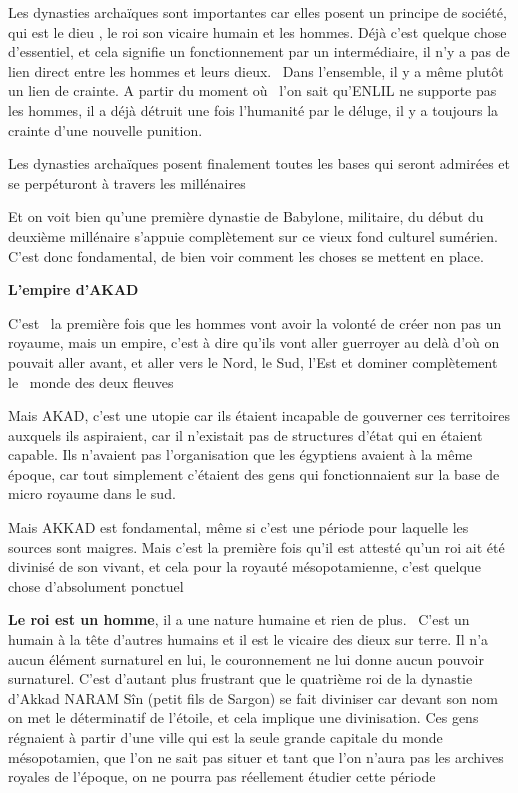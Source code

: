 \documentclass[a4paper]{article}
\begin{document}
\bigskip

{
Les dynasties archaïques sont importantes car elles posent un principe
de société, qui est le dieu , le roi son vicaire humain et les hommes.
Déjà c'est quelque chose d'essentiel, et cela signifie un
fonctionnement par un intermédiaire, il n'y a pas de lien direct entre
les hommes et leurs dieux. \ Dans l'ensemble, il y a même plutôt un
lien de crainte. A partir du moment où \ l'on sait qu'ENLIL ne supporte
pas les hommes, il a déjà détruit une fois l'humanité par le déluge, il
y a toujours la crainte d'une nouvelle punition.}

{
Les dynasties archaïques posent finalement toutes les bases qui seront
admirées et se perpéturont à travers les millénaires}

{
Et on voit bien qu'une première dynastie de Babylone, militaire, du
début du deuxième millénaire s'appuie complètement sur ce vieux fond
culturel sumérien. C'est donc fondamental, de bien voir comment les
choses se mettent en place.}


\bigskip


\bigskip

{
\textbf{L'empire d'AKAD }}

{
C'est \ la première fois que les hommes vont avoir la volonté de créer
non pas un royaume, mais un empire, c'est à dire qu'ils vont aller
guerroyer au delà d'où on pouvait aller avant, et aller vers le Nord,
le Sud, l'Est et dominer complètement le \ monde des deux fleuves}

{
Mais AKAD, c'est une utopie car ils étaient incapable de gouverner ces
territoires auxquels ils aspiraient, car il n'existait pas de
structures d'état qui en étaient capable. Ils n'avaient pas
l'organisation que les égyptiens avaient à la même époque, car tout
simplement c'étaient des gens qui fonctionnaient sur la base de micro
royaume dans le sud.}

{
Mais AKKAD est fondamental, même si c'est une période pour laquelle les
sources sont maigres. Mais c'est la première fois qu'il est attesté
qu'un roi ait été divinisé de son vivant, et cela pour la royauté
mésopotamienne, c'est quelque chose d'absolument ponctuel}


\bigskip


\bigskip


\bigskip

{
\textbf{Le roi est un homme}, il a une nature humaine et rien de plus.
\ C'est un humain à la tête d'autres humains et il est le vicaire des
dieux sur terre. Il n'a aucun élément surnaturel en lui, le
couronnement ne lui donne aucun pouvoir surnaturel. C'est d'autant plus
frustrant que le quatrième roi de la dynastie d'Akkad NARAM Sîn (petit
fils de Sargon) se fait diviniser car devant son nom on met le
déterminatif de l'étoile, et cela implique une divinisation. Ces gens
régnaient à partir d'une ville qui est la seule grande capitale du
monde mésopotamien, que l'on ne sait pas situer et tant que l'on n'aura
pas les archives royales de l'époque, on ne pourra pas réellement
étudier cette période}
\end{document}
